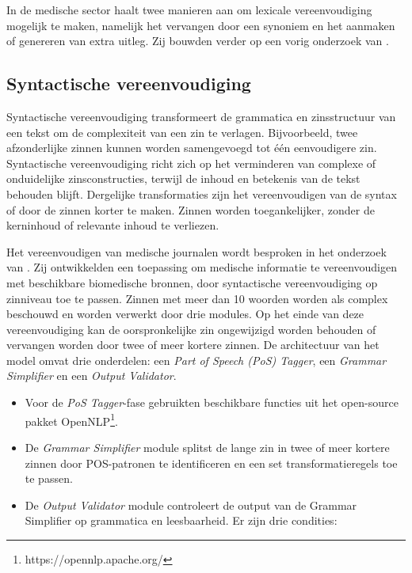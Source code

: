 In de medische sector haalt \textcite{Kandula2010} twee manieren aan om lexicale vereenvoudiging mogelijk te maken, namelijk het vervangen door een synoniem en het aanmaken of genereren van extra uitleg. Zij bouwden verder op een vorig onderzoek van \textcite{Zeng2005}.

\subsection{Syntactische vereenvoudiging}

Syntactische vereenvoudiging transformeert de grammatica en zinsstructuur van een tekst om de complexiteit van een zin te verlagen. Bijvoorbeeld, twee afzonderlijke zinnen kunnen worden samengevoegd tot één eenvoudigere zin. Syntactische vereenvoudiging richt zich op het verminderen van complexe of onduidelijke zinsconstructies, terwijl de inhoud en betekenis van de tekst behouden blijft. Dergelijke transformaties zijn het vereenvoudigen van de syntax of door de zinnen korter te maken. Zinnen worden toegankelijker, zonder de kerninhoud of relevante inhoud te verliezen.

Het vereenvoudigen van medische journalen wordt besproken in het onderzoek van \textcite{Kandula2010}. Zij ontwikkelden een toepassing om medische informatie te vereenvoudigen met beschikbare biomedische bronnen, door syntactische vereenvoudiging op zinniveau toe te passen. Zinnen met meer dan 10 woorden worden als complex beschouwd en worden verwerkt door drie modules. Op het einde van deze vereenvoudiging kan de oorspronkelijke zin ongewijzigd worden behouden of vervangen worden door twee of meer kortere zinnen. De architectuur van het model omvat drie onderdelen: een \textit{Part of Speech (PoS) Tagger}, een \textit{Grammar Simplifier} en een \textit{Output Validator}. 

\begin{itemize}
	\item Voor de \textit{PoS Tagger}-fase gebruikten \textcite{Kandula2010} beschikbare functies uit het open-source pakket OpenNLP\footnote{https://opennlp.apache.org/}.
	\item De \textit{Grammar Simplifier} module splitst de lange zin in twee of meer kortere zinnen door POS-patronen te identificeren en een set transformatieregels toe te passen.
	\item De \textit{Output Validator} module controleert de output van de Grammar Simplifier op grammatica en leesbaarheid. Er zijn drie condities:
\end{itemize}  

